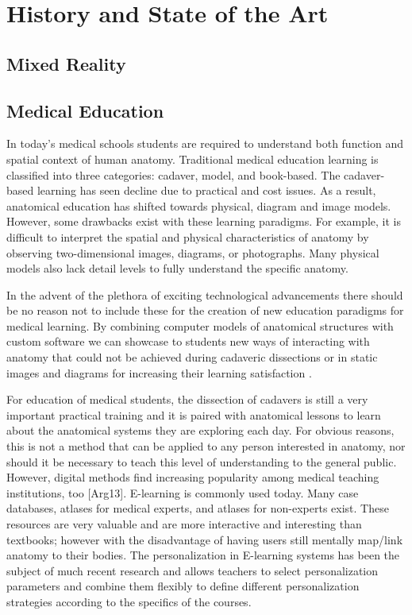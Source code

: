 
\chapter{History and State of the Art}
\section{Mixed Reality}

\section{Medical Education}
In today's medical schools students are required to understand both function and spatial context of human anatomy. Traditional medical education learning is classified into three categories: cadaver, model, and book-based. The cadaver-based learning has seen decline due to practical and cost issues. As a result, anatomical education has shifted towards physical, diagram and image models. However, some drawbacks exist with these learning paradigms. For example, it is difficult to interpret the spatial and physical characteristics of anatomy by observing two-dimensional images, diagrams, or photographs. Many physical models also lack detail levels to fully understand the specific anatomy. 

In the advent of the plethora of exciting technological advancements there should be no reason not to include these for the creation of new education paradigms for medical learning. By combining computer models of anatomical structures with custom software we can showcase to students new ways of interacting with anatomy that could not be achieved during cadaveric dissections or in static images and diagrams for increasing their learning satisfaction \cite{Bacca2014,ma2013ismar,NMC2014}.

For education of medical students, the dissection of cadavers is still a very important practical training and it is paired with anatomical lessons to learn about the anatomical systems they are exploring each day. For obvious reasons, this is not a method that can be applied to any person interested in anatomy, nor should it be necessary to teach this level of understanding to the general public. However, digital methods find increasing popularity among medical teaching institutions, too [Arg13].
E-learning is commonly used today. Many case databases, atlases for medical experts, and atlases for non-experts exist. These resources are very valuable and are more interactive and interesting than textbooks; however with the disadvantage of having users still mentally map/link anatomy to their bodies. The personalization in E-learning systems has been the subject of much recent research and allows teachers to select personalization parameters and combine them flexibly to define different personalization strategies according to the specifics of the courses. 

